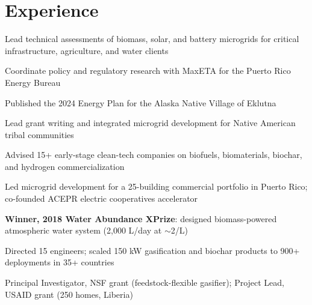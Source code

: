 \documentclass[]{deedy-resume-openfont}
\begin{document}
\hfill
\begin{minipage}[t]{0.67\textwidth}

\section{Experience}

\begin{tightemize}
\item Lead technical assessments of biomass, solar, and battery microgrids for critical infrastructure, agriculture, and water clients
\item Coordinate policy and regulatory research with MaxETA for the Puerto Rico Energy Bureau
\end{tightemize}

\begin{tightemize}
\item Published the 2024 Energy Plan for the Alaska Native Village of Eklutna
\item Lead grant writing and integrated microgrid development for Native American tribal communities
\end{tightemize}

\begin{tightemize}
\item Advised 15+ early-stage clean-tech companies on biofuels, biomaterials, biochar, and hydrogen commercialization
\item Led microgrid development for a 25-building commercial portfolio in Puerto Rico; co-founded ACEPR electric cooperatives accelerator
\end{tightemize}

\begin{tightemize}
\item \textbf{Winner, 2018 Water Abundance XPrize}: designed biomass-powered atmospheric water system (2,000 L/day at $\sim$2\textcent/L)
\end{tightemize}

\begin{tightemize}
\item Directed 15 engineers; scaled 150 kW gasification and biochar products to 900+ deployments in 35+ countries
\item Principal Investigator, NSF grant (feedstock-flexible gasifier); Project Lead, USAID grant (250 homes, Liberia)
\end{tightemize}


\end{minipage}
\end{document}
